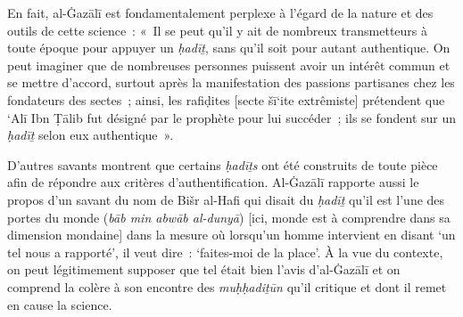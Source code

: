 En fait, al-Ġazālī est fondamentalement perplexe à l'égard de la nature
et des outils de cette science~: «~Il se peut qu'il y ait de nombreux
transmetteurs à toute époque pour appuyer un \emph{ḥadīṯ}, sans qu'il
soit pour autant authentique. On peut imaginer que de nombreuses
personnes puissent avoir un intérêt commun et se mettre d'accord,
surtout après la manifestation des passions partisanes chez les
fondateurs des sectes~; ainsi, les rafiḍites {[}secte šī`ite
extrêmiste{]} prétendent que `Alī Ibn Ṭālib fut désigné par le prophète
pour lui succéder~; ils se fondent sur un \emph{ḥadīṯ} selon eux
authentique~».

D'autres savants montrent que certains \emph{ḥadīṯs} ont été construits
de toute pièce afin de répondre aux critères d'authentification.
Al-Ġazālī \label{theol:AlGazali20} rapporte aussi le propos d'un savant du nom de Bišr al-Hafi
qui disait du \emph{ḥadīṯ} qu'il est l'une des portes du monde
(\emph{bāb min abwāb al-dunyā}) {[}ici, monde est à comprendre dans sa
dimension mondaine{]} dans la mesure où lorsqu'un homme intervient en
disant `un tel nous a rapporté', il veut dire~: `faites-moi de la
place'. À la vue du
contexte, on peut légitimement supposer que tel était bien l'avis
d'al-Ġazālī et on comprend la colère à son encontre des
\emph{muḥḥadiṯūn} qu'il critique et dont il remet en cause la science.


